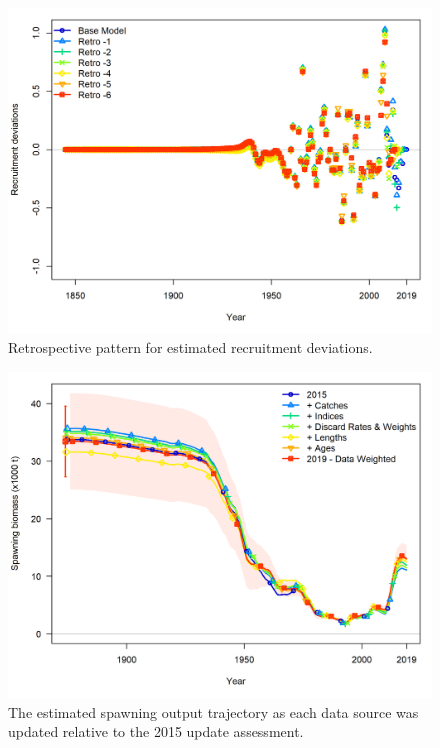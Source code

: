 \documentclass[12pt,]{article}
\begin{document}
\begin{figure}
\centering
\includegraphics{Figures/retro_recdevs_5.png}
\caption{Retrospective pattern for estimated recruitment deviations.
\label{fig:retro_recdev}}
\end{figure}

\FloatBarrier

\begin{figure}
\centering
\includegraphics{Figures/data_ssb.png}
\caption{The estimated spawning output trajectory as each data source
was updated relative to the 2015 update assessment.
\label{fig:ssb_data}}
\end{figure}
\end{document}
